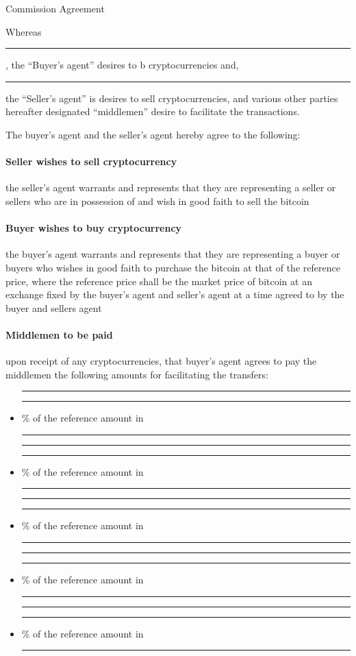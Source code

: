 \documentclass[10pt]{article}
\begin{document}
\begin{center}
{\Large Commission Agreement}
\end{center}



Whereas \rule{6cm}{.2pt}, the “Buyer’s agent” desires to
b cryptocurrencies and, \rule{6cm}{.2pt}the “Seller’s agent” is desires to sell cryptocurrencies, and various other parties hereafter designated “middlemen” desire to facilitate the transactions.  

The buyer’s agent and the seller’s agent hereby agree to the
following:


\paragraph{Seller wishes to sell cryptocurrency} the seller’s agent warrants and represents that they are representing a seller or sellers who are in possession of and wish in good faith to sell the bitcoin

\paragraph{Buyer wishes to buy cryptocurrency} the buyer’s agent warrants and represents that they are representing a buyer or buyers who wishes in good faith to purchase the bitcoin at that  of the reference price, where the reference price shall be the market price of bitcoin at an exchange fixed by the buyer’s agent and seller’s agent at a time agreed to by the buyer and sellers agent

\paragraph{Middlemen to be paid} upon receipt of any cryptocurrencies, that buyer’s agent agrees to pay the middlemen the following amounts for facilitating the transfers:
\begin{itemize}
\item \rule{6cm}{.2pt} \rule{1cm}{.2pt} \% of the reference amount
  in \rule{2cm}{.2pt} 
\item \rule{6cm}{.2pt} \rule{1cm}{.2pt} \% of the reference amount
  in \rule{2cm}{.2pt}
\item \rule{6cm}{.2pt} \rule{1cm}{.2pt} \% of the reference amount
  in \rule{2cm}{.2pt}
\item \rule{6cm}{.2pt} \rule{1cm}{.2pt} \% of the reference amount
  in \rule{2cm}{.2pt}
\item \rule{6cm}{.2pt} \rule{1cm}{.2pt} \% of the reference amount
  in \rule{2cm}{.2pt}
\end{itemize}
\end{document}
